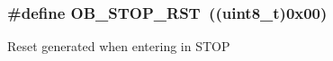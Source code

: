 \subsubsection[{\texorpdfstring{O\+B\+\_\+\+S\+T\+O\+P\+\_\+\+R\+ST}{OB_STOP_RST}}]{\setlength{\rightskip}{0pt plus 5cm}\#define O\+B\+\_\+\+S\+T\+O\+P\+\_\+\+R\+ST~((uint8\+\_\+t)0x00)}\hypertarget{group___f_l_a_s_h_ex___option___bytes__n_r_s_t___s_t_o_p_gaef92c03b1f279c532bfa13d3bb074b57}{}\label{group___f_l_a_s_h_ex___option___bytes__n_r_s_t___s_t_o_p_gaef92c03b1f279c532bfa13d3bb074b57}
Reset generated when entering in S\+T\+OP 